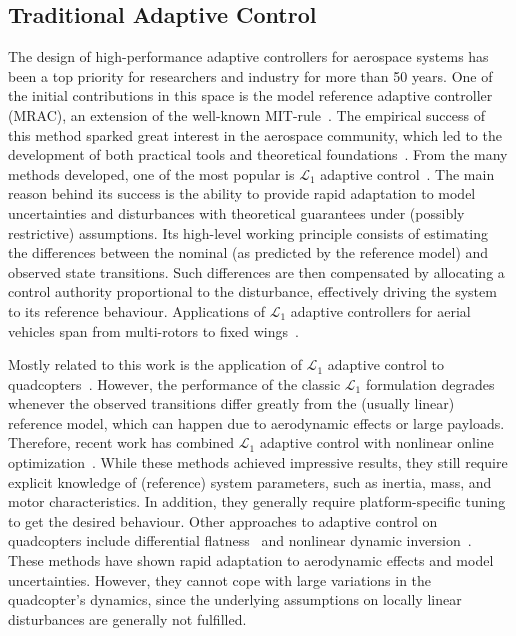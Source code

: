 \subsection{Traditional Adaptive Control}
The design of high-performance adaptive controllers for aerospace systems has been a top priority for researchers and industry for more than 50 years.
%
One of the initial contributions in this space is the model reference adaptive controller (MRAC), an extension of the well-known MIT-rule~\cite{MAREELSMit}.
%
The empirical success of this method sparked great interest in the aerospace community, which led to the development of both practical tools and theoretical foundations~\cite{aastrom2013adaptive, lavretsky2013robust}.
%
From the many methods developed, one of the most popular is $\mathcal{L}_1$ adaptive control~\cite{cao2008design,hovakimyan2010l1}.
%
The main reason behind its success is the ability to provide rapid adaptation to model uncertainties and disturbances with theoretical guarantees under (possibly restrictive) assumptions.
%
Its high-level working principle consists of estimating the differences between the nominal (as predicted by the reference model) and observed state transitions.
%
Such differences are then compensated by allocating a control authority proportional to the disturbance, effectively driving the system to its reference behaviour.
%
Applications of $\mathcal{L}_1$ adaptive controllers for aerial vehicles span from multi-rotors to fixed wings~\cite{mallikarjunan2012l1, gregory2009l1}.

Mostly related to this work is the application of $\mathcal{L}_1$ adaptive control to quadcopters~\cite{schreier2012modeling}.
%
However, the performance of the classic $\mathcal{L}_1$ formulation degrades whenever the observed transitions differ greatly from the (usually linear) reference model, which can happen due to aerodynamic effects or large payloads.
%
Therefore, recent work has combined $\mathcal{L}_1$ adaptive control with nonlinear online optimization~\cite{hanover2021performance, pravitra2020, pereida2018adaptive}.
%
While these methods achieved impressive results, they still require explicit knowledge of (reference) system parameters, such as inertia, mass, and motor characteristics.
%
In addition, they generally require platform-specific tuning to get the desired behaviour. 
%
Other approaches to adaptive control on quadcopters include differential flatness~\cite{faessler2017differential} and nonlinear dynamic inversion~\cite{smeur2016adaptive}.
%
These methods have shown rapid adaptation to aerodynamic effects and model uncertainties.
%
However, they cannot cope with large variations in the quadcopter's dynamics, since the underlying assumptions on locally linear disturbances are generally not fulfilled.
 


